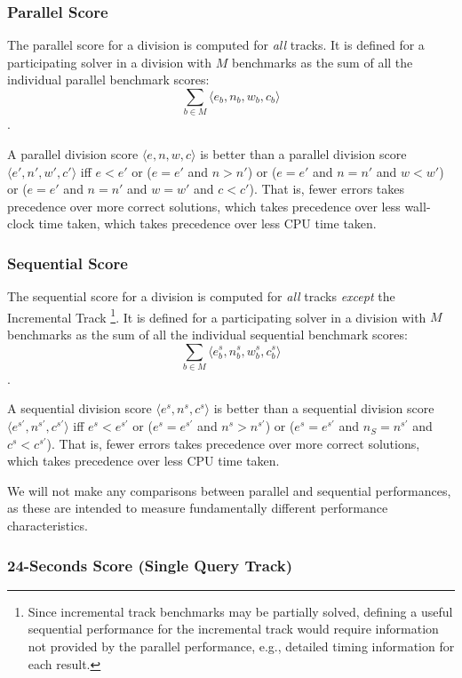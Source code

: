 \documentclass[12pt]{article}
\newcommand{\maintrack}{Single Query Track\xspace}
\newcommand{\inctrack}{Incremental Track\xspace}
\newcommand{\challtrack}{Industry-Challenge Track\xspace}
\begin{document}
\subsubsection{Parallel Score}

The parallel score for a division is computed for \emph{all} tracks.  It is
defined for a participating solver in a division with $M$ benchmarks as the sum
of all the individual parallel benchmark scores:
$$\sum_{b\in M} \langle e_b , n_b , w_b, c_b\rangle$$.

\noindent
A parallel division score $\langle e, n, w, c\rangle$ is better than a parallel
division score $\langle e', n', w', c'\rangle$ iff $e < e'$ or ($e = e'$ and $n
> n'$) or ($e = e'$ and $n = n'$ and $w < w'$) or ($e = e'$ and $n = n'$ and $w
= w'$ and $c < c'$).  That is, fewer errors takes precedence over more correct
solutions, which takes precedence over less wall-clock time taken, which takes
precedence over less CPU time taken.

\subsubsection{Sequential Score}

The sequential score for a division is computed for \emph{all} tracks
\emph{except} the \inctrack
\footnote{Since incremental track benchmarks may be partially
solved, defining a useful sequential performance for the incremental track
would require information not provided by the parallel performance, e.g.,
detailed timing information for each result.}.  It is defined for a
participating solver in a division with $M$ benchmarks as the sum of all the
individual sequential benchmark scores:
$$\sum_{b\in M} \langle e_b^s, n_b^s, w_b^s, c_b^s\rangle$$.

\noindent
A sequential division score $\langle e^s, n^s, c^s\rangle$ is better than a
sequential division score $\langle e^{s'}, n^{s'}, c^{s'}\rangle$ iff
$e^s < e^{s'}$ or ($e^s = e^{s'}$ and $n^s > n^{s'}$) or ($e^s = e^{s'}$ and
$n_S = n^{s'}$ and $c^s < c^{s'}$).
That is, fewer errors takes precedence over more correct solutions,
which takes precedence over less CPU time taken.

We will not make any comparisons between parallel and sequential performances,
as these are intended to measure fundamentally different performance
characteristics.

\subsubsection{24-Seconds Score (\maintrack)}
\end{document}
